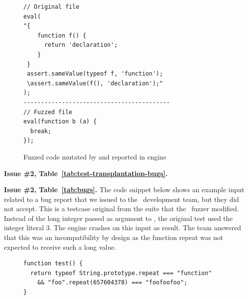 \documentclass[10pt,conference,anonymous]{IEEEtran}
\begin{document}
\begin{figure}[h!]
  \centering
  \scriptsize
  \begin{lstlisting}
// Original file
eval(
"{ 
    function f() { 
      return 'declaration'; 
    } 
 }
 assert.sameValue(typeof f, 'function');
 \assert.sameValue(f(), 'declaration');"
);
------------------------------------------
// Fuzzed file
eval(function b (a) {
  break;
});
  \end{lstlisting}
  \normalsize
  \caption{\label{fig:bug-veight}Fuzzed code mutated by \quickfuzz{}
  and reported in \veight{} engine}
\end{figure}

\vspace{1ex}\noindent\textbf{Issue \#2, Table~\ref{tab:test-transplantation-bugs}.}

\vspace{1ex}\noindent\textbf{Issue \#2, Table~\ref{tab:bugs}.}  The
code snippet below shows an example input related to a bug report that
we issued to the \chakra\ development team, but they did not accept.
This is a testcase original from the \jsc{} suite that the
\radamsa\ fuzzer modified. Instead of the long integer passed as
argument to , the original test used the
integer literal 3. The engine crashes on this input as result. The
team answered that this was an incompatibility by design as the
function repeat was not expected to receive such a long value.

\begin{figure}[h!]
  \centering
  \scriptsize
  \begin{lstlisting}
function test() {
  return typeof String.prototype.repeat === "function"
    && "foo".repeat(657604378) === "foofoofoo";
}
  \end{lstlisting}
  \normalsize
\end{figure}
\end{document}
